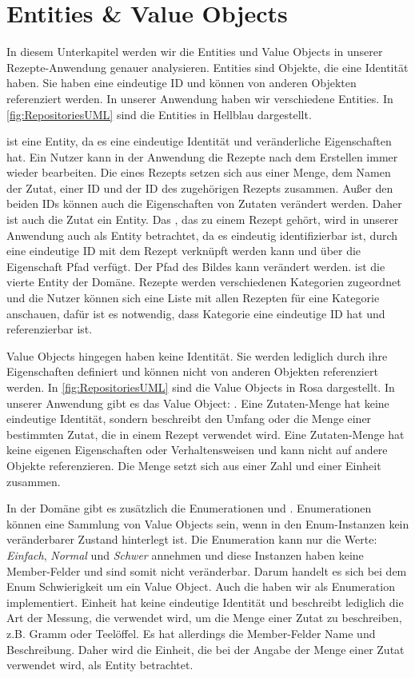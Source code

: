 \section{Entities \& Value Objects}
In diesem Unterkapitel werden wir die Entities und Value Objects in unserer Rezepte-Anwendung genauer analysieren. Entities sind Objekte, die eine Identität haben. Sie haben eine eindeutige ID und können von anderen Objekten referenziert werden. In unserer Anwendung haben wir verschiedene Entities. In \autoref{fig:RepositoriesUML} sind die Entities in Hellblau dargestellt.

 ist eine Entity, da es eine eindeutige Identität und veränderliche Eigenschaften hat. Ein Nutzer kann in der Anwendung die Rezepte nach dem Erstellen immer wieder bearbeiten. Die  eines Rezepts setzen sich aus einer Menge, dem Namen der Zutat, einer ID und der ID des zugehörigen Rezepts zusammen. Außer den beiden IDs können auch die Eigenschaften von Zutaten verändert werden. Daher ist auch die Zutat ein Entity. Das , das zu einem Rezept gehört, wird in unserer Anwendung auch als Entity betrachtet, da es eindeutig identifizierbar ist, durch eine eindeutige ID mit dem Rezept verknüpft werden kann und über die Eigenschaft Pfad verfügt. Der Pfad des Bildes kann verändert werden.  ist die vierte Entity der Domäne. Rezepte werden verschiedenen Kategorien zugeordnet und die Nutzer können sich eine Liste mit allen Rezepten für eine Kategorie anschauen, dafür ist es notwendig, dass Kategorie eine eindeutige ID hat und referenzierbar ist.

Value Objects hingegen haben keine Identität. Sie werden lediglich durch ihre Eigenschaften definiert und können nicht von anderen Objekten referenziert werden. In \autoref{fig:RepositoriesUML} sind die Value Objects in Rosa dargestellt. In unserer Anwendung gibt es das Value Object: . Eine Zutaten-Menge hat keine eindeutige Identität, sondern beschreibt den Umfang oder die Menge einer bestimmten Zutat, die in einem Rezept verwendet wird. Eine Zutaten-Menge hat keine eigenen Eigenschaften oder Verhaltensweisen und kann nicht auf andere Objekte referenzieren. Die Menge setzt sich aus einer Zahl und einer Einheit zusammen. 

In der Domäne gibt es zusätzlich die Enumerationen  und . Enumerationen können eine Sammlung von Value Objects sein, wenn in den Enum-Instanzen kein veränderbarer Zustand hinterlegt ist. Die Enumeration  kann nur die Werte: \emph{Einfach}, \emph{Normal} und \emph{Schwer} annehmen und diese Instanzen haben keine Member-Felder und sind somit nicht veränderbar. Darum handelt es sich bei dem Enum Schwierigkeit um ein Value Object.  Auch die  haben wir als Enumeration implementiert. Einheit hat keine eindeutige Identität und beschreibt lediglich die Art der Messung, die verwendet wird, um die Menge einer Zutat zu beschreiben, z.B. Gramm oder Teelöffel. Es hat allerdings die Member-Felder Name und Beschreibung. Daher wird die Einheit, die bei der Angabe der Menge einer Zutat verwendet wird, als Entity betrachtet.

